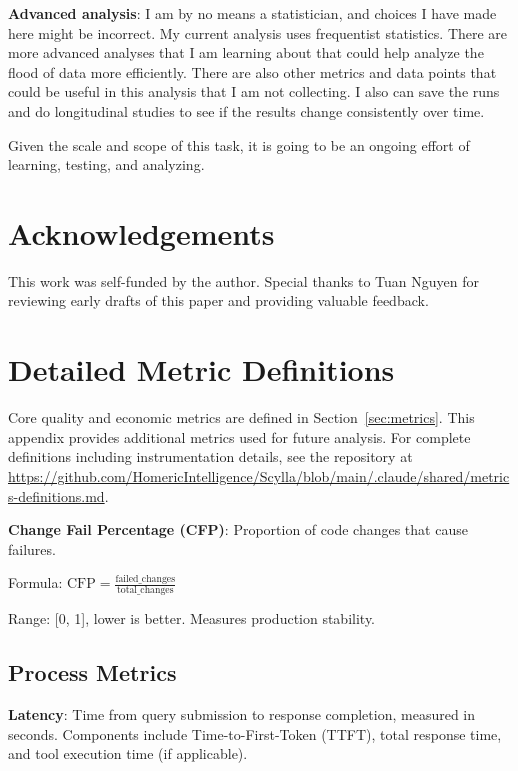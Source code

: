 \documentclass[11pt]{article}
\begin{document}
\textbf{Advanced analysis}: I am by no means a statistician, and choices I have made
here might be incorrect. My current analysis uses frequentist statistics. There
are more advanced analyses that I am learning about that could help analyze the
flood of data more efficiently. There are also other metrics and data points that
could be useful in this analysis that I am not collecting. I also can save the
runs and do longitudinal studies to see if the results change consistently over
time.

Given the scale and scope of this task, it is going to be an ongoing effort of
learning, testing, and analyzing.

\section*{Acknowledgements}

This work was self-funded by the author. Special thanks to Tuan Nguyen for
reviewing early drafts of this paper and providing valuable feedback.





\appendix

\section{Detailed Metric Definitions}

Core quality and economic metrics are defined in Section~\ref{sec:metrics}. This appendix provides additional metrics used for future analysis. For complete definitions including instrumentation details, see the repository at \url{https://github.com/HomericIntelligence/Scylla/blob/main/.claude/shared/metrics-definitions.md}.

\textbf{Change Fail Percentage (CFP)}: Proportion of code changes that cause failures.

Formula: $\text{CFP} = \frac{\text{failed\_changes}}{\text{total\_changes}}$

Range: [0, 1], lower is better. Measures production stability.

\subsection{Process Metrics}

\textbf{Latency}: Time from query submission to response completion, measured in seconds. Components include Time-to-First-Token (TTFT), total response time, and tool execution time (if applicable).
\end{document}
